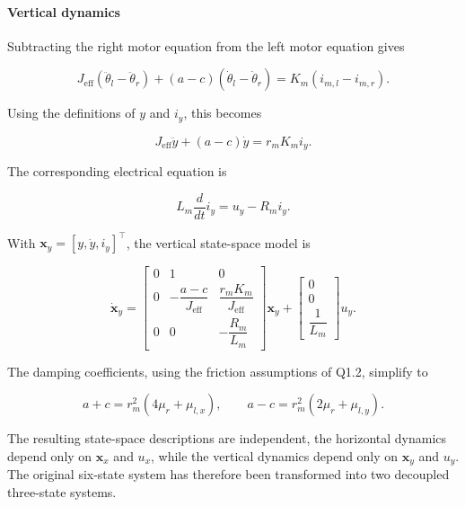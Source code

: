 \documentclass[a4paper,12pt]{article}
\begin{document}
\paragraph{Vertical dynamics}

Subtracting the right motor equation from the left motor equation gives

\begin{equation}
J_{\mathrm{eff}}(\ddot{\theta}_l-\ddot{\theta}_r)
+(a-c)(\dot{\theta}_l-\dot{\theta}_r)
=K_m(i_{m,l}-i_{m,r}).
\end{equation}

Using the definitions of $y$ and $i_y$, this becomes

\begin{equation}
J_{\mathrm{eff}}\ddot{y}
+(a-c)\dot{y}=r_mK_mi_y.
\end{equation}

The corresponding electrical equation is

\begin{equation}
L_m\frac{d}{dt}{i}_y
=u_y-R_mi_y.
\end{equation}

With $\mathbf{x}_y=[y,\dot{y},i_y]^\top$, the vertical state-space model is

\begin{equation}
\boxed{
\dot{\mathbf{x}}_y=
\begin{bmatrix}
0 & 1 & 0\\
0 & -\dfrac{a-c}{J_{\mathrm{eff}}}
  & \dfrac{r_mK_m}{J_{\mathrm{eff}}}\\
0 & 0 & -\dfrac{R_m}{L_m}
\end{bmatrix}
\mathbf{x}_y+
\begin{bmatrix}
0\\0\\\dfrac{1}{L_m}
\end{bmatrix}u_y.
}
\end{equation}

The damping coefficients, using the friction assumptions of Q1.2, simplify to

\begin{equation}
a+c=r_m^2(4\mu_r+\mu_{l,x}),
\qquad
a-c=r_m^2(2\mu_r+\mu_{l,y}).
\end{equation}

The resulting state-space descriptions are independent, the horizontal dynamics depend only on $\mathbf{x}_x$ and $u_x$, while the vertical dynamics depend only on $\mathbf{x}_y$ and $u_y$. The original six-state system has therefore been transformed into two decoupled three-state systems.
\end{document}

